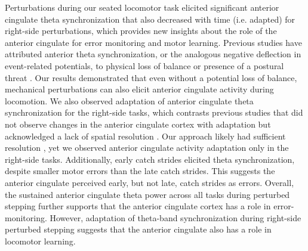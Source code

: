 \documentclass[shortpaper,twoside,web]{ieeecolor}
\begin{document}
Perturbations during our seated locomotor task elicited significant anterior cingulate theta synchronization that also decreased with time (i.e. adapted) for right-side perturbations, which provides new insights about the role of the anterior cingulate for error monitoring and motor learning. Previous studies have attributed anterior theta synchronization, or the analogous negative deflection in event-related potentials, to physical loss of balance or presence of a postural threat \cite{Adkin2008-fw,Peterson2018-ht}. Our results demonstrated that even without a potential loss of balance, mechanical perturbations can also elicit anterior cingulate activity during locomotion. We also observed adaptation of anterior cingulate theta synchronization for the right-side tasks, which contrasts previous studies that did not observe changes in the anterior cingulate cortex with adaptation but acknowledged a lack of spatial resolution \cite{Haefeli2011-ym,Mierau2015-fd}. Our approach likely had sufficient resolution \cite{Shirazi2019-im, Shirazi2019-ke}, yet we observed anterior cingulate activity adaptation only in the right-side tasks. Additionally, early catch strides elicited theta synchronization, despite smaller motor errors than the late catch strides. This suggests the anterior cingulate perceived early, but not late, catch strides as errors. Overall, the sustained anterior cingulate theta power across all tasks during perturbed stepping further supports that the anterior cingulate cortex has a role in error-monitoring. However, adaptation of theta-band synchronization during right-side perturbed stepping suggests that the anterior cingulate also has a role in locomotor learning.
\end{document}
